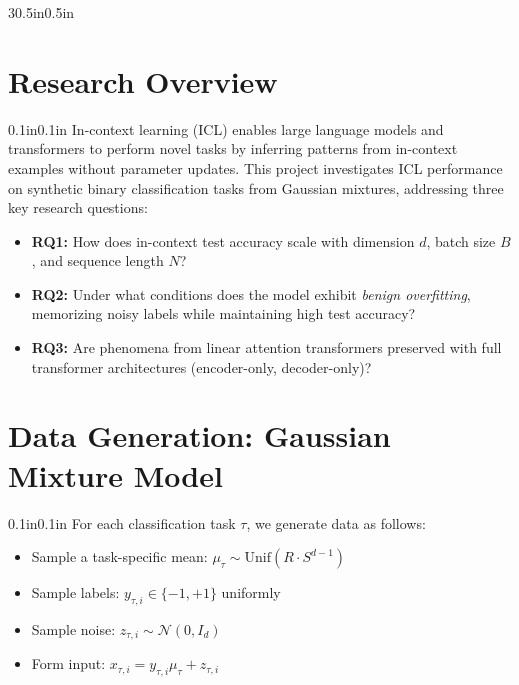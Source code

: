 \documentclass[article,36pt,extrafontsizes,oneside,openany,oldfontcommands]{memoir}
\begin{document}
\begin{adjmulticols*}{3}{0.5in}{0.5in}
\color{bodytextcol}

\section{Research Overview}

\begin{adjustwidth}{0.1in}{0.1in}
In-context learning (ICL) enables large language models and transformers to perform novel tasks by inferring patterns from in-context examples without parameter updates. This project investigates ICL performance on synthetic binary classification tasks from Gaussian mixtures, addressing three key research questions:

\vspace{0.2in}
\begin{itemize}[topsep=0pt,itemsep=0ex,partopsep=1ex,parsep=1ex]
\item \textbf{RQ1:} How does in-context test accuracy scale with dimension $d$, batch size $B$, and sequence length $N$?

\item \textbf{RQ2:} Under what conditions does the model exhibit \emph{benign overfitting}, memorizing noisy labels while maintaining high test accuracy?

\item \textbf{RQ3:} Are phenomena from linear attention transformers preserved with full transformer architectures (encoder-only, decoder-only)?
\end{itemize}

\end{adjustwidth}

\section{Data Generation: Gaussian Mixture Model}

\begin{adjustwidth}{0.1in}{0.1in}
For each classification task $\tau$, we generate data as follows:

\vspace{0.1in}
\begin{itemize}[topsep=0pt,itemsep=0ex,partopsep=1ex,parsep=1ex]
\item Sample a task-specific mean: $\mu_\tau \sim \text{Unif}(R \cdot S^{d-1})$
\item Sample labels: $y_{\tau,i} \in \{-1, +1\}$ uniformly
\item Sample noise: $z_{\tau,i} \sim \mathcal{N}(0, I_d)$
\item Form input: $x_{\tau,i} = y_{\tau,i} \mu_\tau + z_{\tau,i}$
\end{itemize}


\end{adjustwidth}
\end{adjmulticols*}
\end{document}
